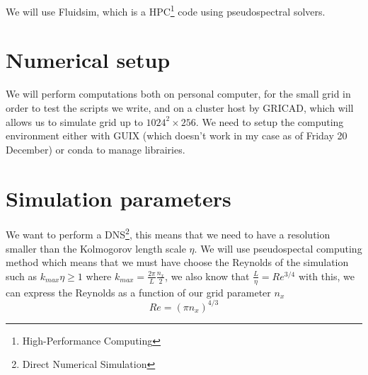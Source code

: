 We will use Fluidsim\cite{fluiddyn}, which is a HPC\footnote{High-Performance Computing} code using pseudospectral solvers.

\section{Numerical setup}
We will perform computations both on personal computer, for the small grid in order to test the scripts we write, and on a cluster host by GRICAD, which will allows us to simulate grid up to $1024^2 \times 256$. We need to setup the computing environment either with GUIX (which doesn't work in my case as of Friday 20 December) or conda to manage librairies. 

\section{Simulation parameters}

We want to perform a DNS\footnote{Direct Numerical Simulation}, this means that we need to have a resolution smaller than the Kolmogorov length scale $\eta$. We will use pseudospectal computing method which means that we must have choose the Reynolds of the simulation such as $k_{max} \eta \geqslant 1$ where $k_{max} = \frac{2\pi}{L} \frac{n_x}{2}$, we also know that $\frac{L}{\eta} = Re^{3/4}$ with this, we can express the Reynolds as a function of our grid parameter $n_x$
\begin{equation}
	Re = \left( \pi n_x \right)^{4/3}
\end{equation}